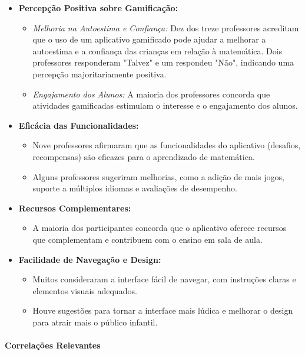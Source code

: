 \begin{itemize}
    \item \textbf{Percepção Positiva sobre Gamificação:}
    \begin{itemize}
        \item \textit{Melhoria na Autoestima e Confiança:} Dez dos treze professores acreditam que o uso de um aplicativo gamificado pode ajudar a melhorar a autoestima e a confiança das crianças em relação à matemática. Dois professores responderam "Talvez" e um respondeu "Não", indicando uma percepção majoritariamente positiva.
        \item \textit{Engajamento dos Alunos:} A maioria dos professores concorda que atividades gamificadas estimulam o interesse e o engajamento dos alunos.
    \end{itemize}
    \item \textbf{Eficácia das Funcionalidades:}
    \begin{itemize}
        \item Nove professores afirmaram que as funcionalidades do aplicativo (desafios, recompensas) são eficazes para o aprendizado de matemática.
        \item Alguns professores sugeriram melhorias, como a adição de mais jogos, suporte a múltiplos idiomas e avaliações de desempenho.
    \end{itemize}
    \item \textbf{Recursos Complementares:}
    \begin{itemize}
        \item A maioria dos participantes concorda que o aplicativo oferece recursos que complementam e contribuem com o ensino em sala de aula.
    \end{itemize}
    \item \textbf{Facilidade de Navegação e Design:}
    \begin{itemize}
        \item Muitos consideraram a interface fácil de navegar, com instruções claras e elementos visuais adequados.
        \item Houve sugestões para tornar a interface mais lúdica e melhorar o design para atrair mais o público infantil.
    \end{itemize}
\end{itemize}

\paragraph{Correlações Relevantes}

